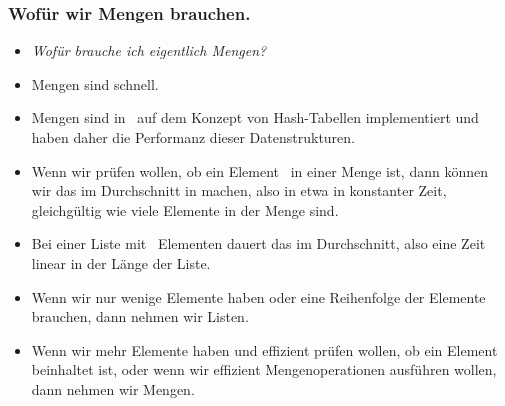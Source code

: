 \documentclass[aspectratio=169,mathserif,notheorems]{beamer}%
\begin{document}
\begin{frame}%
\frametitle{Wofür wir Mengen brauchen.}%
\begin{itemize}%
\item \emph{Wofür brauche ich eigentlich Mengen?}%
%
%
\item<4-> Mengen sind schnell.%
%
\item<5-> Mengen sind in \python\ auf dem Konzept von Hash-Tabellen implementiert und haben daher die Performanz dieser Datenstrukturen.%
%
\item<6-> Wenn wir prüfen wollen, ob ein Element~ in einer Menge ist, dann können wir das im Durchschnitt in  machen, also in etwa in konstanter Zeit, gleichgültig wie viele Elemente in der Menge sind.%
%
\item<7-> Bei einer Liste mit \scale~Elementen dauert das \bigOb{\scale} im Durchschnitt, also eine Zeit linear in der Länge der Liste.
%
\item<8-> Wenn wir nur wenige Elemente haben oder eine Reihenfolge der Elemente brauchen, dann nehmen wir Listen.%
%
\item<9-> Wenn wir mehr Elemente haben und effizient prüfen wollen, ob ein Element beinhaltet ist, oder wenn wir effizient Mengenoperationen ausführen wollen, dann nehmen wir Mengen.%
\end{itemize}%
\end{frame}%
%
\end{document}
